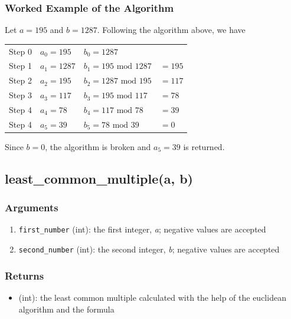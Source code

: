 \documentclass[refman]{scrartcl}
\newcommand{\mymod}{\text{\ \ mod\ \ }}
\begin{document}

\subsubsection*{Worked Example of the Algorithm}

Let \(a = 195\) and \(b = 1287\). Following the algorithm above, we have
%
\begin{center}
	\begin{tabular}{ l l l l }
	 Step 0 & \(a_0 = 195\) & \(b_0 = 1287\) & \\ 
	 Step 1 & \(a_1 = 1287\) & \(b_1 = 195 \mymod 1287\) & \(= 195\) \\  
	 Step 2 & \(a_2 = 195\) & \(b_2 = 1287 \mymod 195\) & \(= 117\) \\
	 Step 3 & \(a_3 = 117 \) & \(b_3 = 195 \mymod 117\) & \(= 78\) \\
	 Step 4 & \(a_4 = 78\) & \(b_4 = 117 \mymod 78\) & \(= 39\)\\
	 Step 4 & \(a_5 = 39\) & \(b_5 = 78 \mymod 39\) & \(= 0\)
	\end{tabular}
\end{center}
%
Since \(b = 0\), the algorithm is broken and \(a_5 = 39\) is returned.

\subsection{least\_common\_multiple(a, b)}

\subsubsection*{Arguments}

\begin{enumerate}
  \item \texttt{first\_number} (int): the first integer, \textit{a}; negative values are accepted
  \item \texttt{second\_number} (int): the second integer, \textit{b}; negative values are accepted
\end{enumerate}

\subsubsection*{Returns}

\begin{itemize}
  \item (int): the least common multiple calculated with the help of the euclidean algorithm and the formula
\end{itemize}
\end{document}
